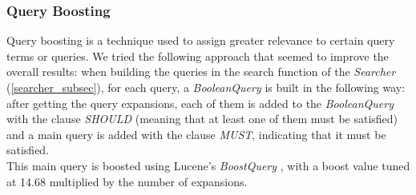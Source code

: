 \enlargethispage{2\baselineskip}
\subsubsection{Query Boosting}
Query boosting is a technique used to assign greater relevance to certain query terms or queries.\newline
We tried the following approach that seemed to improve the overall results: when building the queries in the search function of the \textit{Searcher} (\ref{searcher_subsec}), for each query, a \textit{BooleanQuery} \cite{lucenebooleanquery} is built in the following way: 
after getting the query expansions, each of them is added to the \textit{BooleanQuery} with the clause \textit{SHOULD} (meaning that at least one of them must be satisfied) and a main query is added with the clause \textit{MUST}, indicating that it must be satisfied. \\
This main query is boosted using Lucene's \textit{BoostQuery} \cite{luceneboostquery}, with a boost value tuned at 14.68 multiplied by the number of expansions.